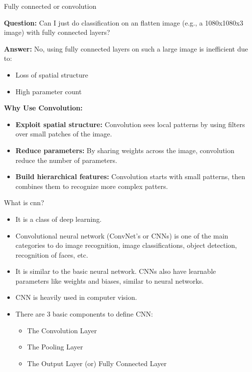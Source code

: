 \documentclass[default, aspectratio=169]{beamer}
\begin{document}
	\begin{frame}{Fully connected or convolution}
		
		\textbf{Question:}
		Can I just do classification on an flatten image (e.g., a 1080x1080x3 image) with fully connected layers?
		
		\bigskip
		
		\textbf{Answer:} 
		No, using fully connected layers on such a large image is inefficient due to:
		\begin{itemize}
			\item Loss of spatial structure
			\item High parameter count
		\end{itemize}
		
		\bigskip
		
		\textbf{Why Use Convolution:}
		\begin{itemize}
			\item \textbf{Exploit spatial structure:} Convolution sees local patterns by using filters over small patches of the image.
			\item \textbf{Reduce parameters:} By sharing weights across the image, convolution reduce the number of parameters.
			\item \textbf{Build hierarchical features:} Convolution starts with small patterns, then combines them to recognize more complex patters.
		\end{itemize}
		
	\end{frame}	
	\begin{frame}{What is cnn?}
		\begin{itemize}
			\item It is a class of deep learning.
			
			\item Convolutional neural network (ConvNet’s or CNNs) is one of the main categories to do image recognition, image classifications, object detection, recognition of faces, etc.
			
			\item It is similar to the basic neural network. CNNs also have learnable parameters like weights and biases, similar to neural networks.
			
			\item CNN is heavily used in computer vision.
			
			\item There are 3 basic components to define CNN:
			\begin{itemize}
				\item The Convolution Layer
				\item The Pooling Layer
				\item The Output Layer (or) Fully Connected Layer
			\end{itemize}
		\end{itemize}
		
	\end{frame}
\end{document}
